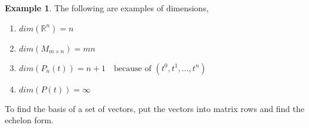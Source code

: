 \documentclass{report}
\theoremstyle{definition}
\newtheorem{ex}{Example}
\begin{document}
\begin{ex} The following are examples of dimensions,

\begin{enumerate}[1)]
 \item $dim(\mathbb{R}^n)=n$
 \item $dim(M_{m\times n})=mn$
 \item $dim(P_n(t))=n+1 \quad \text{because of }(t^0,t^1,...,t^n)$
 \item $dim(P(t))=\infty$
\end{enumerate}
\end{ex}

To find the basis of a set of vectors, put the vectors into matrix rows and find the echelon form.
\end{document}
